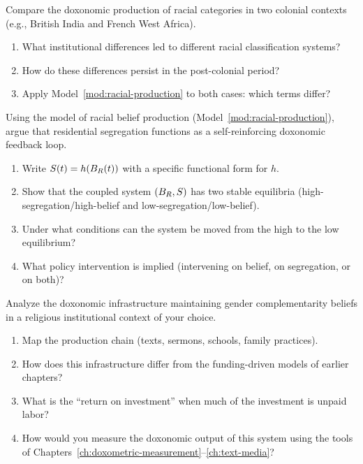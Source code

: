 \begin{exercise}
Compare the doxonomic production of racial categories in two colonial contexts (e.g., British India and French West Africa).
\begin{enumerate}[nosep]
  \item What institutional differences led to different racial classification systems?
  \item How do these differences persist in the post-colonial period?
  \item Apply Model~\ref{mod:racial-production} to both cases: which terms differ?
\end{enumerate}
\end{exercise}

\begin{exercise}
Using the model of racial belief production (Model~\ref{mod:racial-production}), argue that residential segregation functions as a self-reinforcing doxonomic feedback loop.
\begin{enumerate}[nosep]
  \item Write $S(t) = h(B_{R}(t))$ with a specific functional form for $h$.
  \item Show that the coupled system $(B_{R}, S)$ has two stable equilibria (high-segregation/high-belief and low-segregation/low-belief).
  \item Under what conditions can the system be moved from the high to the low equilibrium?
  \item What policy intervention is implied (intervening on belief, on segregation, or on both)?
\end{enumerate}
\end{exercise}

\begin{exercise}
Analyze the doxonomic infrastructure maintaining gender complementarity beliefs in a religious institutional context of your choice.
\begin{enumerate}[nosep]
  \item Map the production chain (texts, sermons, schools, family practices).
  \item How does this infrastructure differ from the funding-driven models of earlier chapters?
  \item What is the ``return on investment'' when much of the investment is unpaid labor?
  \item How would you measure the doxonomic output of this system using the tools of Chapters~\ref{ch:doxometric-measurement}--\ref{ch:text-media}?
\end{enumerate}
\end{exercise}

